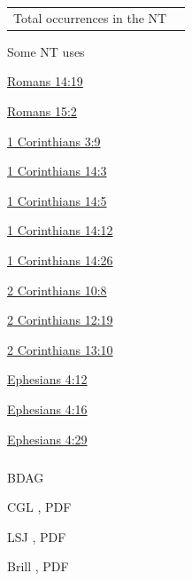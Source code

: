 				\begin{tabular}{ll}
					Total occurrences in the NT & 
				\end{tabular}
				
				\begin{compactdesc}
					\item[Some NT uses] \textbf{}
						\begin{compactdesc}
							\item[{\hyperref[ROMANS-14-19]{Romans 14:19}}]
							\item[{\hyperref[ROMANS-15-2]{Romans 15:2}}]
							\item[{\hyperref[1CORINTHIANS-3-9]{1 Corinthians 3:9}}]
							\item[{\hyperref[1CORINTHIANS-14-3]{1 Corinthians 14:3}}]
							\item[{\hyperref[1CORINTHIANS-14-5]{1 Corinthians 14:5}}]
							\item[{\hyperref[1CORINTHIANS-14-12]{1 Corinthians 14:12}}]
							\item[{\hyperref[1CORINTHIANS-14-26]{1 Corinthians 14:26}}]
							\item[{\hyperref[2CORINTHIANS-10-8]{2 Corinthians 10:8}}]
							\item[{\hyperref[2CORINTHIANS-12-19]{2 Corinthians 12:19}}]
							\item[{\hyperref[2CORINTHIANS-13-10]{2 Corinthians 13:10}}]
							\item[{\hyperref[EPHESIANS-4-12]{Ephesians 4:12}}]
							\item[{\hyperref[EPHESIANS-4-16]{Ephesians 4:16}}]
							\item[{\hyperref[EPHESIANS-4-29]{Ephesians 4:29}}]
						\end{compactdesc}
				\end{compactdesc}
				
				
			\subparagraph{\texorpdfstring{\gr{οἰκονομία}}{}}
				\label{OIKONOMIA}
			
				\begin{compactdesc}
					\item[BDAG ] \textbf{}
						\begin{compactitem}
							\item 
						\end{compactitem}
					\item[CGL , PDF ] \textbf{}
						\begin{compactitem}
							\item 
						\end{compactitem}
					\item[LSJ , PDF ] \textbf{}
						\begin{compactitem}
							\item 
						\end{compactitem}
					\item[Brill , PDF ] \textbf{}
						\begin{compactitem}
							\item 
						\end{compactitem}
				\end{compactdesc}
				
